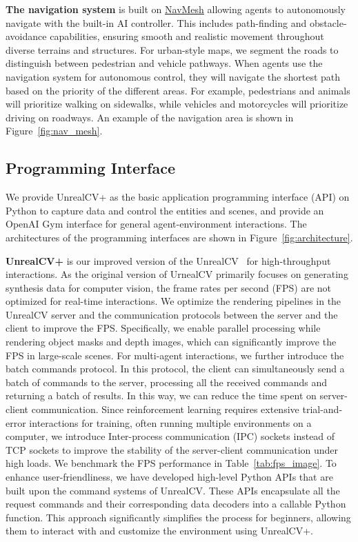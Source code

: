 \documentclass{article}
\begin{document}
\textbf{The navigation system} is built on \href{https://dev.epicgames.com/documentation/en-us/unreal-engine/world-partitioned-navigation-mesh?application_version=5.4}{NavMesh} allowing agents to autonomously navigate with the built-in AI controller.
This includes path-finding and obstacle-avoidance capabilities, ensuring smooth and realistic movement throughout diverse terrains and structures.
For urban-style maps, we segment the roads to distinguish between pedestrian and vehicle pathways. When agents use the navigation system for autonomous control, they will navigate the shortest path based on the priority of the different areas. For example, pedestrians and animals will prioritize walking on sidewalks, while vehicles and motorcycles will prioritize driving on roadways. An example of the navigation area is shown in Figure~\ref{fig:nav_mesh}.


\subsection{Programming Interface}

\label{sec:unrealcv}
We provide UnrealCV+ as the basic application programming interface (API) on Python to capture data and control the entities and scenes, and provide an OpenAI Gym interface for general agent-environment interactions. The architectures of the programming interfaces are shown in Figure~\ref{fig:architecture}.

\textbf{UnrealCV+} is our improved version of the UnrealCV~\citep{qiu2017unrealcv} for high-throughput interactions. As the original version of UrnealCV primarily focuses on generating synthesis data for computer vision, the frame rates per second (FPS) are not optimized for real-time interactions.
We optimize the rendering pipelines in the UnrealCV server and the communication protocols between the server and the client to improve the FPS. Specifically, we enable parallel processing while rendering object masks and depth images, which can significantly improve the FPS in large-scale scenes.
For multi-agent interactions, we further introduce the batch commands protocol. In this protocol, the client can simultaneously send a batch of commands to the server, processing all the received commands and returning a batch of results. In this way, we can reduce the time spent on server-client communication. Since reinforcement learning requires extensive trial-and-error interactions for training, often running multiple environments on a computer, we introduce Inter-process communication (IPC) sockets instead of TCP sockets to improve the stability of the server-client communication under high loads. We benchmark the FPS performance in Table~\ref{tab:fps_image}. 
To enhance user-friendliness, we have developed high-level Python APIs that are built upon the command systems of UnrealCV. These APIs encapsulate all the request commands and their corresponding data decoders into a callable Python function. This approach significantly simplifies the process for beginners, allowing them to interact with and customize the environment using UnrealCV+.
\end{document}
